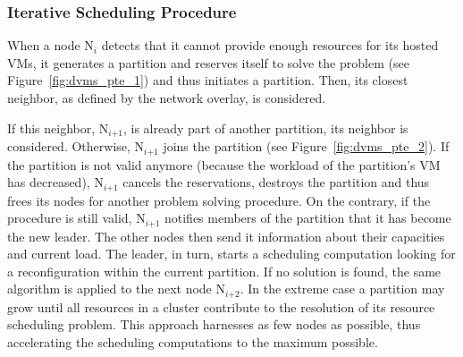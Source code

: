\subsubsection{Iterative Scheduling Procedure}

When a node N\(_{\textit{i}}\)
detects that it cannot provide enough resources for its hosted VMs, it
generates a partition and reserves itself to solve the problem (see
Figure~\ref{fig:dvms_pte_1}) and thus initiates a partition. Then, its
closest neighbor, as defined by the network overlay, is considered.

If this neighbor, N\(_{\textit{i+1}}\),
is already part of another partition, its neighbor is considered.
Otherwise, N\(_{\textit{i+1}}\)
joins the partition (see Figure~\ref{fig:dvms_pte_2}).  If the
partition is not valid anymore (\eg because the workload of the
partition's VM has decreased), N\(_{\textit{i+1}}\)
cancels the reservations, destroys the partition and thus frees its
nodes for another problem solving procedure.
%
On the contrary, if the procedure is still valid, N\(_{\textit{i+1}}\)
notifies members of the partition that it has become the new
leader. The other nodes then send it information about their
capacities and current load. The leader, in turn, starts a scheduling
computation looking for a reconfiguration within the current
partition. If no solution is found, the same algorithm is applied to
the next node N\(_{\textit{i+2}}\).
In the extreme case a partition may grow until all resources in a
cluster contribute to the resolution of its resource scheduling
problem. This approach harnesses as few nodes as possible, thus
accelerating the scheduling computations to the maximum possible.


